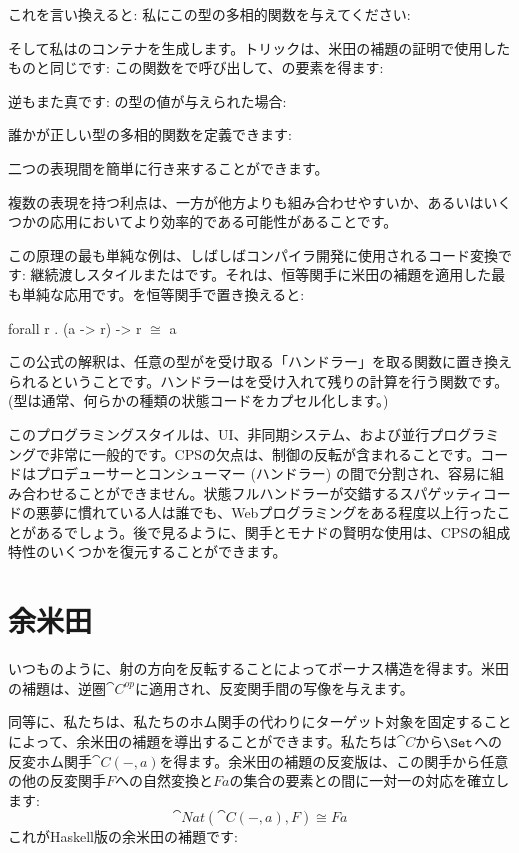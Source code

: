 これを言い換えると: 私にこの型の多相的関数を与えてください: 

そして私はのコンテナを生成します。トリックは、米田の補題の証明で使用したものと同じです: この関数をで呼び出して、の要素を得ます: 

逆もまた真です: の型の値が与えられた場合: 

誰かが正しい型の多相的関数を定義できます: 

二つの表現間を簡単に行き来することができます。

複数の表現を持つ利点は、一方が他方よりも組み合わせやすいか、あるいはいくつかの応用においてより効率的である可能性があることです。

この原理の最も単純な例は、しばしばコンパイラ開発に使用されるコード変換です: 継続渡しスタイルまたはです。それは、恒等関手に米田の補題を適用した最も単純な応用です。を恒等関手で置き換えると: 

\begin{snipv}
forall r . (a -> r) -> r \ensuremath{\cong} a
\end{snipv}
この公式の解釈は、任意の型がを受け取る「ハンドラー」を取る関数に置き換えられるということです。ハンドラーはを受け入れて残りの計算を行う関数です。  (型は通常、何らかの種類の状態コードをカプセル化します。) 

このプログラミングスタイルは、UI、非同期システム、および並行プログラミングで非常に一般的です。CPSの欠点は、制御の反転が含まれることです。コードはプロデューサーとコンシューマー (ハンドラー) の間で分割され、容易に組み合わせることができません。状態フルハンドラーが交錯するスパゲッティコードの悪夢に慣れている人は誰でも、Webプログラミングをある程度以上行ったことがあるでしょう。後で見るように、関手とモナドの賢明な使用は、CPSの組成特性のいくつかを復元することができます。

\section{余米田}

いつものように、射の方向を反転することによってボーナス構造を得ます。米田の補題は、逆圏$\cat{C}^\mathit{op}$に適用され、反変関手間の写像を与えます。

同等に、私たちは、私たちのホム関手の代わりにターゲット対象を固定することによって、余米田の補題を導出することができます。私たちは$\cat{C}$から$\Set$への反変ホム関手$\cat{C}(-, a)$を得ます。余米田の補題の反変版は、この関手から任意の他の反変関手$F$への自然変換と$F a$の集合の要素との間に一対一の対応を確立します: 
\[\cat{Nat}(\cat{C}(-, a), F) \cong F a\]
これがHaskell版の余米田の補題です: 

